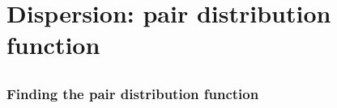 
\section{Dispersion: pair distribution function}

\subsection{}

\begin{frame}
  \frametitle{Finding the pair distribution function}
  \begin{figure}[h]
    \centering
  \end{figure}
\end{frame}

